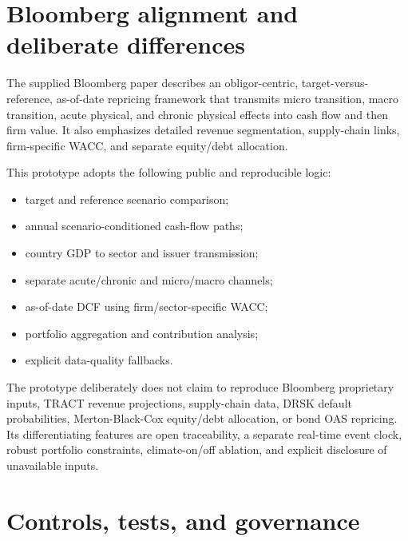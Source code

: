\documentclass[10pt]{article}
\begin{document}
\section{Bloomberg alignment and deliberate differences}

The supplied Bloomberg paper describes an obligor-centric, target-versus-reference, as-of-date repricing framework that transmits micro transition, macro transition, acute physical, and chronic physical effects into cash flow and then firm value. It also emphasizes detailed revenue segmentation, supply-chain links, firm-specific WACC, and separate equity/debt allocation.

This prototype adopts the following public and reproducible logic:
\begin{itemize}
  \item target and reference scenario comparison;
  \item annual scenario-conditioned cash-flow paths;
  \item country GDP to sector and issuer transmission;
  \item separate acute/chronic and micro/macro channels;
  \item as-of-date DCF using firm/sector-specific WACC;
  \item portfolio aggregation and contribution analysis;
  \item explicit data-quality fallbacks.
\end{itemize}

The prototype deliberately does not claim to reproduce Bloomberg proprietary inputs, TRACT revenue projections, supply-chain data, DRSK default probabilities, Merton-Black-Cox equity/debt allocation, or bond OAS repricing. Its differentiating features are open traceability, a separate real-time event clock, robust portfolio constraints, climate-on/off ablation, and explicit disclosure of unavailable inputs.

\section{Controls, tests, and governance}
\end{document}
